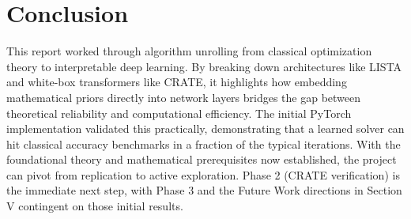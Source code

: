 \documentclass[conference]{IEEEtran}
\begin{document}
\section{Conclusion}
This report worked through algorithm unrolling from classical optimization theory to interpretable deep learning. By breaking down architectures like LISTA and white-box transformers like CRATE, it highlights how embedding mathematical priors directly into network layers bridges the gap between theoretical reliability and computational efficiency. The initial PyTorch implementation validated this practically, demonstrating that a learned solver can hit classical accuracy benchmarks in a fraction of the typical iterations. With the foundational theory and mathematical prerequisites now established, the project can pivot from replication to active exploration. Phase 2 (CRATE verification) is the immediate next step, with Phase 3 and the Future Work directions in Section V contingent on those initial results.
\nocite{*}

 
\end{document}

